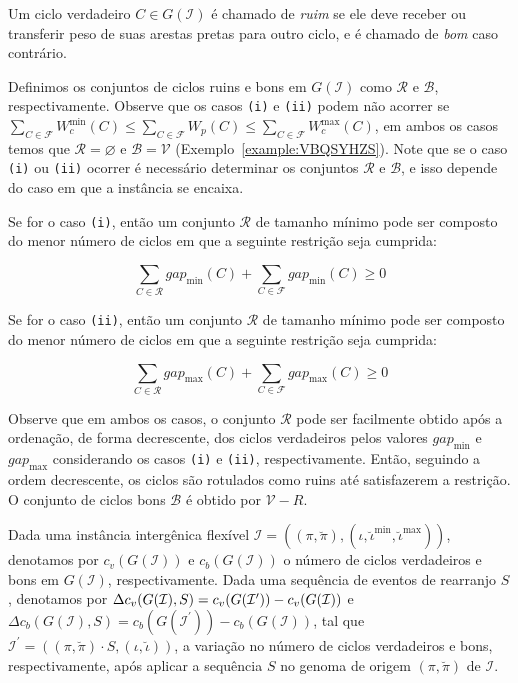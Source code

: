 \begin{definition}
Um ciclo verdadeiro $C \in G(\mathcal{I})$ é chamado de \emph{ruim} se ele deve receber ou transferir peso de suas arestas pretas para outro ciclo, e é chamado de \emph{bom} caso contrário.
\end{definition}

Definimos os conjuntos de ciclos ruins e bons em $G(\mathcal{I})$ como $\mathcal{R}$ e $\mathcal{B}$, respectivamente. Observe que os casos \texttt{(i)} e \texttt{(ii)} podem não acorrer se $\sum_{C \in \mathcal{F}} W^{\min}_c(C) \le \sum_{C \in \mathcal{F}} W_p(C) \le \sum_{C \in \mathcal{F}} W^{\max}_c(C)$, em ambos os casos temos que $\mathcal{R} = \varnothing$ e $\mathcal{B} = \mathcal{V}$ (Exemplo~\ref{example:VBQSYHZS}). Note que se o caso \texttt{(i)} ou \texttt{(ii)} ocorrer é necessário determinar os conjuntos $\mathcal{R}$ e $\mathcal{B}$, e isso depende do caso em que a instância se encaixa. 

Se for o caso \texttt{(i)}, então um conjunto $\mathcal{R}$ de tamanho mínimo pode ser composto do menor número de ciclos em que a seguinte restrição seja cumprida:

$$\sum_{C \in \mathcal{R}} gap_{\min}(C) + \sum_{C \in \mathcal{F}} gap_{\min}(C) \ge 0$$

Se for o caso \texttt{(ii)}, então um conjunto $\mathcal{R}$ de tamanho mínimo pode ser composto do menor número de ciclos em que a seguinte restrição seja cumprida:

$$\sum_{C \in \mathcal{R}} gap_{\max}(C) + \sum_{C \in \mathcal{F}} gap_{\max}(C) \ge 0$$

Observe que em ambos os casos, o conjunto $\mathcal{R}$ pode ser facilmente obtido após a ordenação, de forma decrescente, dos ciclos verdadeiros pelos valores $gap_{\min}$ e $gap_{\max}$ considerando os casos \texttt{(i)} e \texttt{(ii)}, respectivamente. Então, seguindo a ordem decrescente, os ciclos são rotulados como ruins até satisfazerem a restrição. O conjunto de ciclos bons $\mathcal{B}$ é obtido por $\mathcal{V}-{R}$.

Dada uma instância intergênica flexível $\mathcal{I} = ((\pi,\breve\pi),(\iota,\breve\iota^{\min},\breve\iota^{\max}))$, denotamos por $c_v(G(\mathcal{I}))$ e $c_b(G(\mathcal{I}))$ o número de ciclos verdadeiros e bons em $G(\mathcal{I})$, respectivamente. Dada uma sequência de eventos de rearranjo $S$, denotamos por $\Delta c_v(G(\mathcal{I}), S) = c_v(G(\mathcal{I^{\prime}}))\break - c_v(G(\mathcal{I}))$ e $\Delta c_b(G(\mathcal{I}), S) = c_b(G(\mathcal{I^{\prime}})) - c_b(G(\mathcal{I}))$, tal que $\mathcal{I^{\prime}} = ((\pi,\breve\pi) \cdot S,(\iota,\breve\iota))$, a variação no número de ciclos verdadeiros e bons, respectivamente, após aplicar a sequência $S$ no genoma de origem $(\pi,\breve\pi)$ de $\mathcal{I}$.

